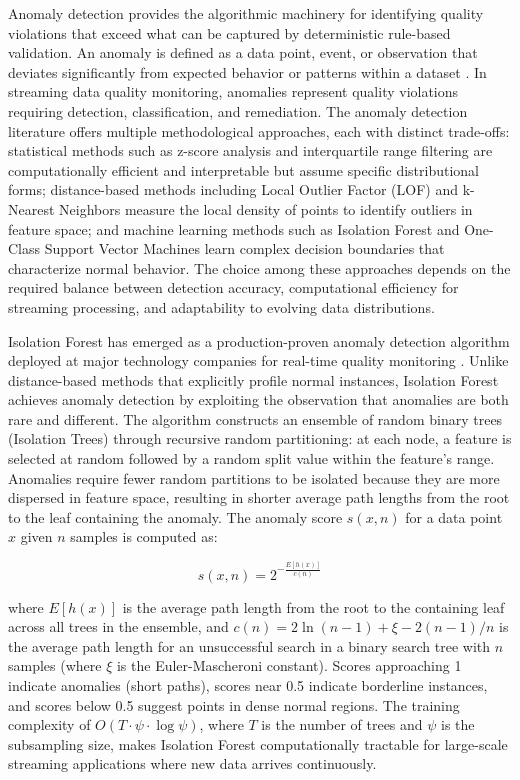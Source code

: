 Anomaly detection provides the algorithmic machinery for identifying quality violations that exceed what can be captured by deterministic rule-based validation. An anomaly is defined as a data point, event, or observation that deviates significantly from expected behavior or patterns within a dataset \citep{liu2008isolation}. In streaming data quality monitoring, anomalies represent quality violations requiring detection, classification, and remediation. The anomaly detection literature offers multiple methodological approaches, each with distinct trade-offs: statistical methods such as z-score analysis and interquartile range filtering are computationally efficient and interpretable but assume specific distributional forms; distance-based methods including Local Outlier Factor (LOF) \citep{breunig2000lof} and k-Nearest Neighbors measure the local density of points to identify outliers in feature space; and machine learning methods such as Isolation Forest \citep{liu2008isolation} and One-Class Support Vector Machines \citep{scholkopf2001oc} learn complex decision boundaries that characterize normal behavior. The choice among these approaches depends on the required balance between detection accuracy, computational efficiency for streaming processing, and adaptability to evolving data distributions.

Isolation Forest has emerged as a production-proven anomaly detection algorithm deployed at major technology companies for real-time quality monitoring \citep{liu2008isolation}. Unlike distance-based methods that explicitly profile normal instances, Isolation Forest achieves anomaly detection by exploiting the observation that anomalies are both rare and different. The algorithm constructs an ensemble of random binary trees (Isolation Trees) through recursive random partitioning: at each node, a feature is selected at random followed by a random split value within the feature's range. Anomalies require fewer random partitions to be isolated because they are more dispersed in feature space, resulting in shorter average path lengths from the root to the leaf containing the anomaly. The anomaly score $s(x, n)$ for a data point $x$ given $n$ samples is computed as:

\begin{equation}
s(x, n) = 2^{-\frac{E[h(x)]}{c(n)}}
\end{equation}

where $E[h(x)]$ is the average path length from the root to the containing leaf across all trees in the ensemble, and $c(n) = 2\ln(n-1) + \xi - 2(n-1)/n$ is the average path length for an unsuccessful search in a binary search tree with $n$ samples (where $\xi$ is the Euler-Mascheroni constant). Scores approaching 1 indicate anomalies (short paths), scores near 0.5 indicate borderline instances, and scores below 0.5 suggest points in dense normal regions. The training complexity of $O(T \cdot \psi \cdot \log \psi)$, where $T$ is the number of trees and $\psi$ is the subsampling size, makes Isolation Forest computationally tractable for large-scale streaming applications where new data arrives continuously.

